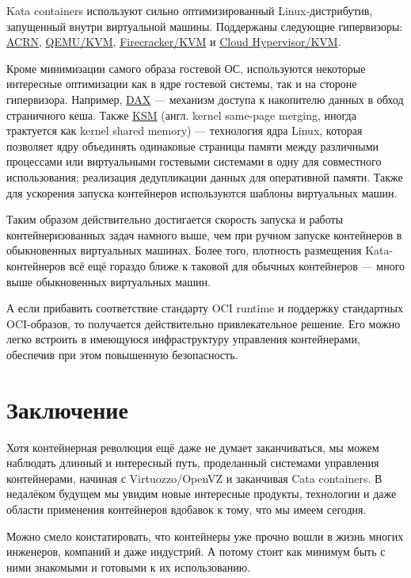 \documentclass[14pt, a4paper]{article}
\begin{document}
Kata containers используют сильно оптимизированный Linux-дистрибутив, запущенный внутри
виртуальной машины. Поддержаны следующие гипервизоры: \href{https://projectacrn.org/}{ACRN}, \href{https://firecracker-microvm.github.io/}{QEMU/KVM}, \href{https://firecracker-microvm.github.io/}{Firecracker/KVM} и
\href{https://github.com/cloud-hypervisor/cloud-hypervisor}{Cloud Hypervisor/KVM}.

Кроме минимизации самого образа гостевой ОС, используются некоторые интересные оптимизации
как в ядре гостевой системы, так и на стороне гипервизора. Например, \href{https://www.kernel.org/doc/Documentation/filesystems/dax.txt}{DAX} — механизм доступа к
накопителю данных в обход страничного кеша. Также \href{https://ru.wikipedia.org/wiki/KSM}{KSM} (англ. kernel same-page merging, иногда
трактуется как kernel shared memory) — технология ядра Linux, которая позволяет ядру объединять
одинаковые страницы памяти между различными процессами или виртуальными гостевыми
системами в одну для совместного использования; реализация дедупликации данных для
оперативной памяти. Также для ускорения запуска контейнеров используются шаблоны виртуальных
машин.

Таким образом действительно достигается скорость запуска и работы контейнеризованных задач
намного выше, чем при ручном запуске контейнеров в обыкновенных виртуальных машинах. Более
того, плотность размещения Kata-контейнеров всё ещё гораздо ближе к таковой для обычных
контейнеров — много выше обыкновенных виртуальных машин.

А если прибавить соответствие стандарту OCI runtime и поддержку стандартных OCI-образов, то
получается действительно привлекательное решение. Его можно легко встроить в имеющуюся
инфраструктуру управления контейнерами, обеспечив при этом повышенную безопасность.\newpage


\section*{Заключение}

Хотя контейнерная революция ещё даже не думает заканчиваться, мы можем наблюдать длинный и
интересный путь, проделанный системами управления контейнерами, начиная с Virtuozzo/OpenVZ и
заканчивая Cata containers. В недалёком будущем мы увидим новые интересные продукты,
технологии и даже области применения контейнеров вдобавок к тому, что мы имеем сегодня.

Можно смело констатировать, что контейнеры уже прочно вошли в жизнь многих инженеров,
компаний и даже индустрий. А потому стоит как минимум быть с ними знакомыми и готовыми к их
использованию.\newpage
\end{document}
